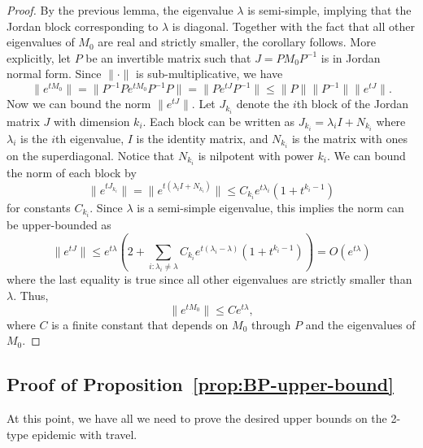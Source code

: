 \documentclass[11pt]{article}
\begin{document}
\begin{proof}By the previous lemma, the eigenvalue $\lambda$ is semi-simple, implying that the Jordan block corresponding to $\lambda$ is diagonal. Together with the fact that all other eigenvalues of $M_0$ are real and strictly smaller, the corollary follows.  More explicitly, let $P$ be an invertible matrix such that $J=PM_0P^{-1}$ is in Jordan normal form.  Since $\|\cdot
\|$ is sub-multiplicative, we have
$$  
\|e^{tM_0}\|=\|P^{-1}Pe^{tM_0}P^{-1}P\|=\|P e^{tJ} P^{-1}\|\leq \|P\| \|P^{-1}\|\|e^{tJ}\|.
$$
Now we can bound the norm $\| e^{tJ}\|$. Let $J_{k_i}$ denote the $i$th block of the Jordan matrix $J$ with dimension $k_i$. Each block can be written as $J_{k_i} = \lambda_i I + N_{k_i}$ where $\lambda_i$ is the $i$th eigenvalue, $I$ is the identity matrix, and $N_{k_i}$ is the matrix with ones on the superdiagonal. Notice that $N_{k_i}$ is nilpotent with power $k_i$. We can bound the norm of each block by
\[
    \|e^{t J_{k_i}}\| = \|e^{t(\lambda_i I + N_{k_i})} \| \leq C_{k_i}e^{t \lambda_i}(1+t^{k_i -1})
\]
for constants $C_{k_i}$. Since $\lambda$ is a semi-simple eigenvalue, this implies the norm can be upper-bounded as
\[
    \|e^{tJ}\| \leq e^{t \lambda}\left(2 + \sum_{i:\lambda_i \neq \lambda}C_{k_i} e^{t(\lambda_i - \lambda)}(1+t^{k_i-1})\right) = O(e^{t \lambda})
\]
where the last equality is true since all other eigenvalues are strictly smaller than $\lambda$. Thus, 
\[
    \|e^{tM_0}\| \leq C e^{t\lambda},
\]
where $C$ is a finite constant that depends on $M_0$ through $P$ and the eigenvalues of $M_0$.
\end{proof}


\subsection{Proof of  Proposition~\ref{prop:BP-upper-bound}}

At this point, we have all we need to prove the desired upper bounds on the 2-type epidemic with travel. 
\end{document}
